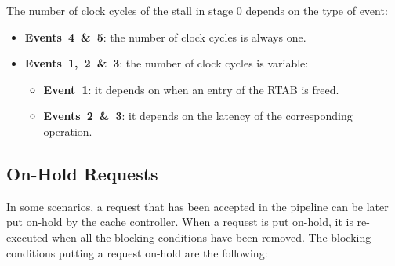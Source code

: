 \documentclass[10pt,titlepage,twoside]{book}
\begin{document}
The number of clock cycles of the stall in stage 0 depends on the type of event:
\begin{itemize}
\item \textbf{Events~4~\&~5}: the number of clock cycles is always one.
\item \textbf{Events~1,~2~\&~3}: the number of clock cycles is variable:
  \begin{itemize}
  \item \textbf{Event~1}: it depends on when an entry of the \ac{RTAB} is freed.
  \item \textbf{Events~2~\&~3}: it depends on the latency of the corresponding operation.
  \end{itemize}
\end{itemize}


\subsection{On-Hold Requests}

In some scenarios, a request that has been accepted in the pipeline can be later put on-hold by the cache controller.
When a request is put on-hold, it is re-executed when all the blocking conditions have been removed.
The blocking conditions putting a request on-hold are the following:
\end{document}
